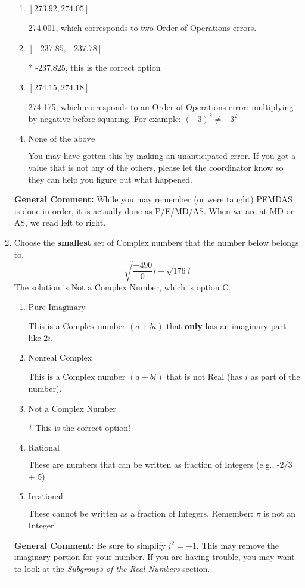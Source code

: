 \documentclass{extbook}[14pt]
\newcommand{\litem}[1]{\item #1

\rule{\textwidth}{0.4pt}}
\begin{document}
\begin{enumerate}
{\begin{enumerate}[label=\Alph*.]
 -237.999, which corresponds to an Order of Operations error: not reading left-to-right for multiplication/division.
\item \( [273.92, 274.05] \)

 274.001, which corresponds to two Order of Operations errors.
\item \( [-237.85, -237.78] \)

* -237.825, this is the correct option
\item \( [274.15, 274.18] \)

 274.175, which corresponds to an Order of Operations error: multiplying by negative before squaring. For example: $(-3)^2 \neq -3^2$
\item \( \text{None of the above} \)

 You may have gotten this by making an unanticipated error. If you got a value that is not any of the others, please let the coordinator know so they can help you figure out what happened.
\end{enumerate}

\textbf{General Comment:} While you may remember (or were taught) PEMDAS is done in order, it is actually done as P/E/MD/AS. When we are at MD or AS, we read left to right.
}
\litem{
Choose the \textbf{smallest} set of Complex numbers that the number below belongs to.
\[ \sqrt{\frac{-490}{0}} i+\sqrt{176}i \]The solution is \( \text{Not a Complex Number} \), which is option C.\begin{enumerate}[label=\Alph*.]
\item \( \text{Pure Imaginary} \)

This is a Complex number $(a+bi)$ that \textbf{only} has an imaginary part like $2i$.
\item \( \text{Nonreal Complex} \)

This is a Complex number $(a+bi)$ that is not Real (has $i$ as part of the number).
\item \( \text{Not a Complex Number} \)

* This is the correct option!
\item \( \text{Rational} \)

These are numbers that can be written as fraction of Integers (e.g., -2/3 + 5)
\item \( \text{Irrational} \)

These cannot be written as a fraction of Integers. Remember: $\pi$ is not an Integer!
\end{enumerate}

\textbf{General Comment:} Be sure to simplify $i^2 = -1$. This may remove the imaginary portion for your number. If you are having trouble, you may want to look at the \textit{Subgroups of the Real Numbers} section.
}
\end{enumerate}
\end{document}
